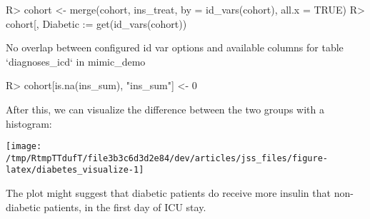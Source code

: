 \documentclass[
]{jss}
\begin{document}
\begin{CodeChunk}
\begin{CodeInput}
R> cohort <- merge(cohort, ins_treat, by = id_vars(cohort), all.x = TRUE)
R> cohort[, Diabetic := get(id_vars(cohort)) %
\end{CodeInput}

\begin{CodeOutput}
No overlap between configured id var options and available columns for table
`diagnoses_icd` in mimic_demo
\end{CodeOutput}

\begin{CodeInput}
R> cohort[is.na(ins_sum), "ins_sum"] <- 0
\end{CodeInput}
\end{CodeChunk}

After this, we can visualize the difference between the two groups with
a histogram:

\begin{CodeChunk}


\begin{center}\texttt{[image: /tmp/RtmpTTdufT/file3b3c6d3d2e84/dev/articles/jss\_files/figure-latex/diabetes\_visualize-1]} \end{center}

\end{CodeChunk}

The plot might suggest that diabetic patients do receive more insulin
that non-diabetic patients, in the first day of ICU stay.


\end{document}

